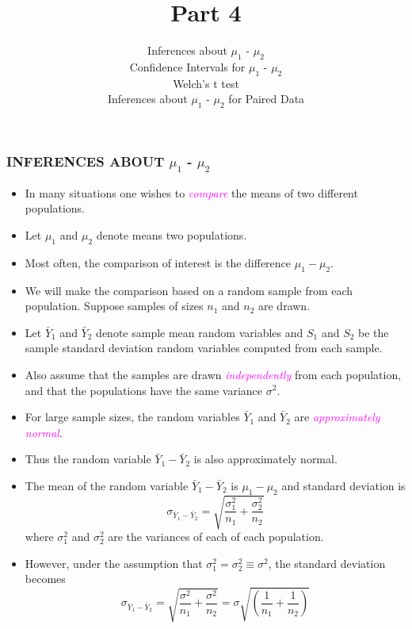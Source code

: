 \documentclass[xcolor=dvipsnames,12pt]{beamer}
\title[]{Part 4}
\author[Stat 801]{Inferences about {\boldmath$\mu_1$ - $\mu_2$}\\
Confidence Intervals for {\boldmath$\mu_1$ - $\mu_2$}\\
Welch's t test\\
Inferences about {\boldmath$\mu_1$ - $\mu_2$} for Paired Data}
\date{}
\begin{document}
\begin{frame}[plain]
  \titlepage
\end{frame}




\begin{frame}
\frametitle{INFERENCES ABOUT {\boldmath$\mu_1$ - $\mu_2$}}
\begin{itemize}
\item In many situations one wishes to  \textcolor{magenta}{\textit{compare}} the means
of two different populations.  
\item Let $\mu_1$ and $\mu_2$ denote means two populations. 
\item Most often, the comparison of interest is the difference
$\mu_1 - \mu_2$.
\item We will make the comparison based on a random sample
from each population.  Suppose samples of sizes $n_1$ and $n_2$ are
drawn.
\end{itemize}
\end{frame}


\begin{frame}
\begin{itemize}
\item  Let $\bar{Y}_1$ and $\bar{Y}_2$ denote sample mean random
variables and $S_1$ and $S_2$ be the sample standard deviation 
random variables computed from each sample.
\item  Also assume that the samples are drawn  \textcolor{magenta}{\textit{independently}}
from each population, and that the populations have the same
variance $\sigma^2$.
\item  For large sample sizes, the random variables $\bar{Y}_1$ and $\bar{Y}_2$ are
\textcolor{magenta}{\textit{approximately normal}}.
\item Thus the random variable $\bar{Y}_1 - \bar{Y}_2$ is
also approximately normal.
\end{itemize}
\end{frame}


\begin{frame}
\begin{itemize}
\item The mean of the random variable $\bar{Y}_1 - \bar{Y}_2$  is $\mu_1 - \mu_2$ 
and standard deviation is
$$
  \sigma_{\bar{Y}_1 - \bar{Y}_2} =
  \sqrt{\frac{\sigma_1^2}{n_1} + \frac{\sigma_2^2}{n_2}} 
$$
where $\sigma_1^2$ and $\sigma_2^2$ are the variances of each 
of each population. 
\item However,  under the assumption  that
$\sigma_1^2 = \sigma_2^2 \equiv \sigma^2$, the standard deviation becomes
$$
  \sigma_{\bar{Y}_1 - \bar{Y}_2} =
  \sqrt{\frac{\sigma^2}{n_1} + \frac{\sigma^2}{n_2}} =\sigma\sqrt{\left(\frac{1}{n_1}+\frac{1}{n_2}\right)}
$$
\end{itemize}
\end{frame}
\end{document}
